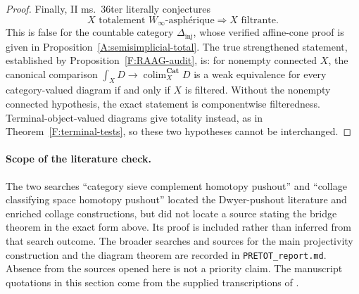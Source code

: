 \documentclass[11pt,a4paper]{article}
\theoremstyle{definition}
\theoremstyle{remark}
\newcommand{\Cat}{\mathbf{Cat}}
\newcommand{\Winfty}{W_\infty}
\newcommand{\colim}{\operatorname*{colim}}
\begin{document}
\begin{proof}
Finally, II ms.~36ter literally conjectures
\[
 X\text{ totalement }\Winfty\text{-asph\'erique}
 \Longrightarrow X\text{ filtrante}.
\]
This is false for the countable category $\Delta_{\mathrm{inj}}$, whose verified affine-cone proof is given in Proposition~\ref{A:semisimplicial-total}. The true strengthened statement, established by Proposition~\ref{F:RAAG-audit}, is: for nonempty connected $X$, the canonical comparison $\int_X D\to\colim_X^{\Cat}D$ is a weak equivalence for every category-valued diagram if and only if $X$ is filtered. Without the nonempty connected hypothesis, the exact statement is componentwise filteredness. Terminal-object-valued diagrams give totality instead, as in Theorem~\ref{F:terminal-tests}, so these two hypotheses cannot be interchanged.
\end{proof}

\paragraph{Scope of the literature check.}
The two searches ``category sieve complement homotopy pushout'' and ``collage classifying space homotopy pushout'' located the Dwyer-pushout literature and enriched collage constructions, but did not locate a source stating the bridge theorem in the exact form above. Its proof is included rather than inferred from that search outcome. The broader searches and sources for the main projectivity construction and the diagram theorem are recorded in \texttt{PRETOT\_report.md}. Absence from the sources opened here is not a priority claim. The manuscript quotations in this section come from the supplied transcriptions of \citet{GrothendieckDerivateurs}.

\end{document}

